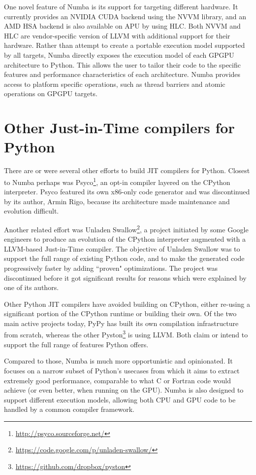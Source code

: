 \documentclass{acm_proc_article-sp}
\begin{document}
One novel feature of Numba is its support for targeting different
hardware.  It currently provides an NVIDIA CUDA backend using the NVVM
library, and an AMD HSA backend is also available on APU by using HLC.
Both NVVM and HLC are vendor-specific version of LLVM with additional
support for their hardware.  Rather than attempt to create a portable
execution model supported by all targets, Numba directly exposes the
execution model of each GPGPU architecture to Python.  This allows the
user to tailor their code to the specific features and performance
characteristics of each architecture.  Numba provides access to
platform specific operations, such as thread barriers and atomic
operations on GPGPU targets.

\section{Other Just-in-Time compilers for Python}

There are or were several other efforts to build JIT compilers for
Python.  Closest to Numba perhaps was
Psyco\footnote{\url{http://psyco.sourceforge.net/}}, an opt-in
compiler layered on the CPython interpreter.  Psyco featured its own
x86-only code generator and was discontinued by its author, Armin
Rigo, because its architecture made maintenance and evolution
difficult. \cite{rigo2004representation}

Another related effort was
Unladen Swallow\footnote{\url{https://code.google.com/p/unladen-swallow/}},
a project initiated by some
Google engineers to produce an evolution of the CPython interpreter augmented
with a LLVM-based Just-in-Time compiler.
The objective of Unladen Swallow was to support the full range of existing
Python code, and to make the generated code progressively faster by adding
``proven" optimizations.  The project was discontinued before it got
significant results for reasons which were explained by one of its authors.
\cite{kleckner:unladen_swallow_post_mortem}

Other Python JIT compilers have avoided building on CPython, either
re-using a significant portion of the CPython runtime or building
their own.  Of the two main active projects today, PyPy
\cite{pypy:pypy} has built its own compilation infrastructure from
scratch, whereas the other
Pyston\footnote{\url{https://github.com/dropbox/pyston}} is using
LLVM.  Both claim or intend to support the full range of features
Python offers.

Compared to those, Numba is much more opportunistic and opinionated.
It focuses on a narrow subset of Python's usecases from which it aims
to extract extremely good performance, comparable to what C or Fortran
code would achieve (or even better, when running on the GPU).  Numba
is also designed to support different execution models, allowing both
CPU and GPU code to be handled by a common compiler framework.
\end{document}

